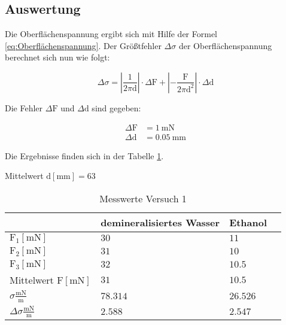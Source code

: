         \subsection{Auswertung}

            Die Oberflächenspannung ergibt sich mit Hilfe der Formel \ref{eq:Oberflächenspannung}.
            Der Größtfehler $\Delta \sigma$ der Oberflächenspannung berechnet sich nun wie folgt:

            \begin{equation}
                \Delta \sigma = \left| \frac{1}{2 \pi \mathrm{d}} \right| \cdot \Delta \mathrm{F} + \left| -\frac{\mathrm{F}}{2 \pi \mathrm{d}^2} \right| \cdot \Delta \mathrm{d} 
                \label{eq:Größtfehler}
            \end{equation}

            Die Fehler $\Delta \mathrm{F}$ und $\Delta \mathrm{d}$ sind gegeben:

            \begin{equation}
                \begin{aligned}
                    \Delta \mathrm{F} &= 1\ \mathrm{mN}\\
                    \Delta \mathrm{d} &= 0.05\ \mathrm{mm}
                \end{aligned}
                \label{eq:Fehler_V1}
            \end{equation}

            Die Ergebnisse finden sich in der Tabelle \ref{tab:Versuch1_Ergebnisse}.

            Mittelwert $\mathrm{d[mm]} = 63$\\

            \begin{table}[H]
                \centering
                \caption{Messwerte Versuch 1}
                \label{tab:Versuch1_Ergebnisse}
                \vspace*{1em}
                \begin{tabular}{|l|l|l|l|}
                    \hline
                    & demineralisiertes Wasser & Ethanol \\
                    \hline
                    $\mathrm{F_1 [mN]}$ & $30$ & $11$\\
                    \hline
                    $\mathrm{F_2 [mN]}$ & $31$ & $10$\\
                    \hline
                    $\mathrm{F_3 [mN]}$ & $32$ & $10.5$\\
                    \hline
                    Mittelwert $\mathrm{F [mN]}$ & $31$ & $10.5$\\
                    \hline
                    $\sigma \frac{\mathrm{mN}}{\mathrm{m}}$ & $78.314$ & $26.526$\\
                    \hline
                    $\Delta \sigma \frac{\mathrm{mN}}{\mathrm{m}}$ & $2.588$ & $2.547$\\
                    \hline
                \end{tabular}
            \end{table}
        
